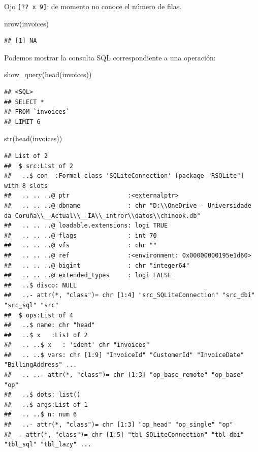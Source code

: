 \documentclass[
]{book}
\newenvironment{Shaded}{\begin{snugshade}}{\end{snugshade}}
\newcommand{\FunctionTok}[1]{\textcolor[rgb]{0.00,0.00,0.00}{#1}}
\newcommand{\NormalTok}[1]{#1}
\theoremstyle{break}
\theoremstyle{nonumberplain}
\begin{document}
Ojo \texttt{{[}??\ x\ 9{]}}: de momento no conoce el número de filas.

\begin{Shaded}
\begin{Highlighting}[]
\FunctionTok{nrow}\NormalTok{(invoices)}
\end{Highlighting}
\end{Shaded}

\begin{verbatim}
## [1] NA
\end{verbatim}

Podemos mostrar la consulta SQL correspondiente a una operación:

\begin{Shaded}
\begin{Highlighting}[]
\FunctionTok{show\_query}\NormalTok{(}\FunctionTok{head}\NormalTok{(invoices))}
\end{Highlighting}
\end{Shaded}

\begin{verbatim}
## <SQL>
## SELECT *
## FROM `invoices`
## LIMIT 6
\end{verbatim}

\begin{Shaded}
\begin{Highlighting}[]
\FunctionTok{str}\NormalTok{(}\FunctionTok{head}\NormalTok{(invoices))}
\end{Highlighting}
\end{Shaded}

\begin{verbatim}
## List of 2
##  $ src:List of 2
##   ..$ con  :Formal class 'SQLiteConnection' [package "RSQLite"] with 8 slots
##   .. .. ..@ ptr                :<externalptr> 
##   .. .. ..@ dbname             : chr "D:\\OneDrive - Universidade da Coruña\\__Actual\\__IA\\_intror\\datos\\chinook.db"
##   .. .. ..@ loadable.extensions: logi TRUE
##   .. .. ..@ flags              : int 70
##   .. .. ..@ vfs                : chr ""
##   .. .. ..@ ref                :<environment: 0x00000000195e1d60> 
##   .. .. ..@ bigint             : chr "integer64"
##   .. .. ..@ extended_types     : logi FALSE
##   ..$ disco: NULL
##   ..- attr(*, "class")= chr [1:4] "src_SQLiteConnection" "src_dbi" "src_sql" "src"
##  $ ops:List of 4
##   ..$ name: chr "head"
##   ..$ x   :List of 2
##   .. ..$ x   : 'ident' chr "invoices"
##   .. ..$ vars: chr [1:9] "InvoiceId" "CustomerId" "InvoiceDate" "BillingAddress" ...
##   .. ..- attr(*, "class")= chr [1:3] "op_base_remote" "op_base" "op"
##   ..$ dots: list()
##   ..$ args:List of 1
##   .. ..$ n: num 6
##   ..- attr(*, "class")= chr [1:3] "op_head" "op_single" "op"
##  - attr(*, "class")= chr [1:5] "tbl_SQLiteConnection" "tbl_dbi" "tbl_sql" "tbl_lazy" ...
\end{verbatim}
\end{document}
